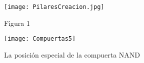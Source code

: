     \begin{wrapfigure}{r}{0.35\textwidth}
        \centering
        \texttt{[image: PilaresCreacion.jpg]}
        \caption{Figura 1}
    \end{wrapfigure}

    \begin{figure}[h]
        \centering
        \texttt{[image: Compuertas5]}
        \caption{La posición especial de la compuerta NAND}
    \end{figure}